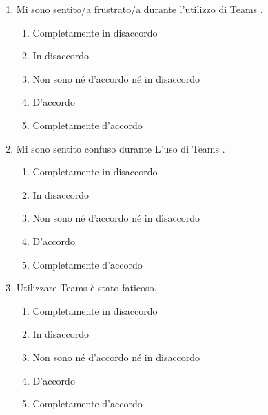\documentclass{article}
\newcommand{\app}{Teams \hspace{0.1em}}
\begin{document}
\begin{enumerate}[label=\textbf{Domanda \arabic*.}, resume]
    \item Mi sono sentito/a frustrato/a durante l’utilizzo di \app.
    \begin{enumerate}
    \item Completamente in disaccordo
    \item In disaccordo
    \item Non sono né d’accordo né in disaccordo
    \item D’accordo
    \item Completamente d’accordo
\end{enumerate}
    \item Mi sono sentito confuso durante L'uso di \app.
    \begin{enumerate}
    \item Completamente in disaccordo
    \item In disaccordo
    \item Non sono né d’accordo né in disaccordo
    \item D’accordo
    \item Completamente d’accordo
\end{enumerate}

\vspace{1em}
    \item Utilizzare \app è stato faticoso.
    \begin{enumerate}
    \item Completamente in disaccordo
    \item In disaccordo
    \item Non sono né d’accordo né in disaccordo
    \item D’accordo
    \item Completamente d’accordo
\end{enumerate}
\end{enumerate}
\end{document}

